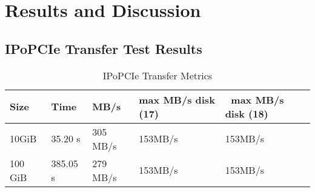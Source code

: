 \chapter{Results and Discussion}


\section{IPoPCIe Transfer Test Results}






\begin{table}[htbp]
    \centering
    \begin{minipage}[b]{\textwidth}
        \centering
        \caption{IPoPCIe Transfer Metrics}
        \label{tab:ipopcie1_results}
        \begin{tabular}{lllll}
            \toprule
            \textbf{Size} & \textbf{Time} & \textbf{MB/s} & \textbf{max MB/s disk (17)} & \textbf{$~$ max MB/s disk (18)}\\
            \midrule
            10GiB &35.20 s&305 MB/s&153MB/s&153MB/s\\
            100 GiB& 385.05 s &279 MB/s& 153MB/s & 153MB/s\\
            \bottomrule
        \end{tabular}
    \end{minipage}
\end{table}
